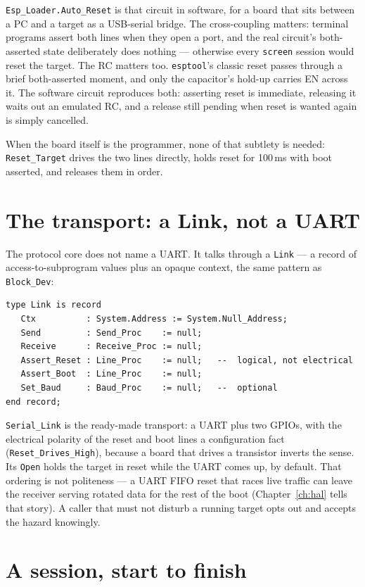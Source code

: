 \texttt{Esp\_Loader.Auto\_Reset} is that circuit in software, for a board that
sits between a PC and a target as a USB-serial bridge. The cross-coupling
matters: terminal programs assert both lines when they open a port, and the
real circuit's both-asserted state deliberately does nothing --- otherwise every
\texttt{screen} session would reset the target. The RC matters too.
\texttt{esptool}'s classic reset passes through a brief both-asserted moment,
and only the capacitor's hold-up carries EN across it. The software circuit
reproduces both: asserting reset is immediate, releasing it waits out an
emulated RC, and a release still pending when reset is wanted again is simply
cancelled.

When the board itself is the programmer, none of that subtlety is needed:
\texttt{Reset\_Target} drives the two lines directly, holds reset for
100\,ms with boot asserted, and releases them in order.

\section{The transport: a Link, not a UART}

The protocol core does not name a UART. It talks through a \texttt{Link} --- a
record of access-to-subprogram values plus an opaque context, the same pattern
as \texttt{Block\_Dev}:

\begin{lstlisting}
type Link is record
   Ctx          : System.Address := System.Null_Address;
   Send         : Send_Proc    := null;
   Receive      : Receive_Proc := null;
   Assert_Reset : Line_Proc    := null;   --  logical, not electrical
   Assert_Boot  : Line_Proc    := null;
   Set_Baud     : Baud_Proc    := null;   --  optional
end record;
\end{lstlisting}

\texttt{Serial\_Link} is the ready-made transport: a UART plus two GPIOs, with
the electrical polarity of the reset and boot lines a configuration fact
(\texttt{Reset\_Drives\_High}), because a board that drives a transistor
inverts the sense. Its \texttt{Open} holds the target in reset while the UART
comes up, by default. That ordering is not politeness --- a UART FIFO reset
that races live traffic can leave the receiver serving rotated data for the
rest of the boot (Chapter~\ref{ch:hal} tells that story). A caller that must
not disturb a running target opts out and accepts the hazard knowingly.

\section{A session, start to finish}

